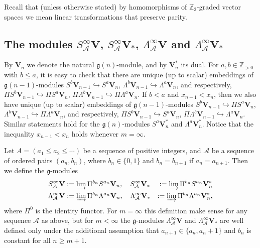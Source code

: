 \documentclass[12pt]{amsart}
\newcommand\Z{\mathbb{Z}}
\newcommand\g{\mathfrak{g}}
\newcommand\cA{\mathcal{A}}
\newcommand\bV{\mathbf{V}}
\theoremstyle{plain}
\theoremstyle{definition}
\numberwithin{equation}{section}
\begin{document}
Recall that  (unless otherwise stated) by homomorphisms of $\Z_{2}$-graded vector spaces we mean linear transformations that preserve parity.

\subsection*{The modules $S_\cA^\infty \bV$, $S_\cA^\infty \bV_*$, $\Lambda_\cA^\infty \bV$ and $\Lambda_\cA^\infty \bV_*$} By $\bV_{n}$ we denote the natural $\g(n)$-module, and by $\bV_{n}^*$ its dual. For $a,b\in \Z_{>0}$ with $b\leq a$, it is easy to check that there are unique (up to scalar) embeddings of $\g(n-1)$-modules $S^b\bV_{n-1}\hookrightarrow S^a\bV_n$, $\Lambda^b\bV_{n-1}\hookrightarrow \Lambda^a\bV_n$, and respectively, $\Pi S^b\bV_{n-1}\hookrightarrow \Pi S^a\bV_n$, $\Pi \Lambda^b\bV_{n-1}\hookrightarrow \Pi \Lambda^a\bV_n$. If $b<a$ and $x_{n-1}<x_n$, then we also have unique (up to scalar) embeddings of $\g(n-1)$-modules $S^b\bV_{n-1}\hookrightarrow \Pi S^a\bV_n$, $\Lambda^b\bV_{n-1}\hookrightarrow \Pi \Lambda^a\bV_n$, and respectively, $\Pi S^b\bV_{n-1}\hookrightarrow S^a\bV_n$, $\Pi \Lambda^b\bV_{n-1}\hookrightarrow \Lambda^a\bV_n$. Similar statements hold for the $\g(n)$-modules $S^a \bV_{n}^*$ and $\Lambda^a \bV_{n}^*$. Notice that the inequality $x_{n-1}<x_n$ holds whenever $m=\infty$.

Let $A = (a_1\leq a_2\leq \cdots)$ be a sequence of positive integers, and $\cA$ be a sequence of ordered pairs $(a_n,b_n)$, where $b_n\in \{0,1\}$ and $b_n = b_{n+1}$ if $a_n = a_{n+1}$. Then we define the $\g$-modules
\begin{eqnarray*}
S_\cA^\infty \bV & :=\varinjlim \Pi^{b_n} S^{a_n}\bV_n, \quad S_\cA^\infty \bV_* & :=\varinjlim \Pi^{b_n} S^{a_n}\bV_n^* \\
\Lambda_\cA^{\infty} \bV & :=\varinjlim \Pi^{b_n} \Lambda^{a_n}\bV_n, \quad \Lambda_\cA^{\infty} \bV_* & :=\varinjlim \Pi^{b_n} \Lambda^{a_n}\bV_n^*,
\end{eqnarray*}
where $\Pi^0$ is the identity functor. For $m=\infty$ this definition make sense for any sequence $\cA$ as above, but for $m<\infty$ the $\g$-modules $\Lambda_\cA^{\infty} \bV$ and $\Lambda_\cA^{\infty} \bV_*$ are well defined only under the additional assumption that $a_{n+1}\in \{a_n, a_n+1\}$ and $b_n$ is constant for all $n\geq m+1$.
\end{document}
